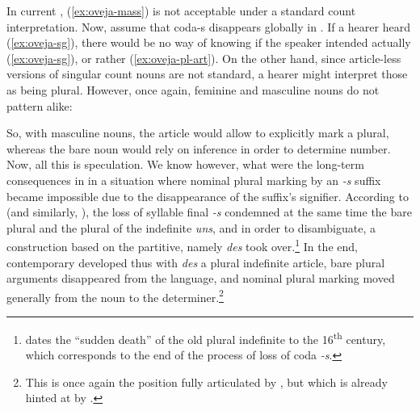 \documentclass[output=paper,hidelinks]{langscibook}
\begin{document}
In current , (\ref{ex:oveja-mass}) is not acceptable under a standard count interpretation. Now, assume that coda-s disappears globally in . If a hearer heard (\ref{ex:oveja-sg}), there would be no way of knowing if the speaker intended actually (\ref{ex:oveja-sg}), or rather (\ref{ex:oveja-pl-art}). On the other hand, since article-less versions of singular count nouns are not standard, a hearer might interpret those as being plural. However, once again, feminine and masculine nouns do not pattern alike:

\begin{exe}
  \ex
  \begin{xlist}
  \end{xlist}
\end{exe}

So, with masculine nouns, the article would allow to explicitly mark a plural, whereas the bare noun would rely on inference in order to determine number. Now, all this is speculation. We know however, what were the long-term consequences in  in a situation where nominal plural marking by an \emph{-s} suffix became impossible due to the disappearance of the suffix's signifier. According to \citet[30]{woledge56} (and similarly, \citealt{carlier01}), the loss of syllable final \emph{-s} condemned at the same time the bare plural and the plural of the indefinite \emph{uns}, and in order to disambiguate, a construction based on the partitive, namely \emph{des} took over.\footnote{\citet[30]{woledge56} dates the ``sudden death'' of the old plural indefinite to the 16\textsuperscript{th} century, which corresponds to the end of the process of loss of coda \emph{-s}.} In the end, contemporary  developed thus with \emph{des} a plural indefinite article, bare plural arguments disappeared from the language, and nominal plural marking moved generally from the noun to the determiner.\footnote{This is once again the position fully articulated by \citet{massot08}, but which is already hinted at by \citet{woledge56}.}
\end{document}

